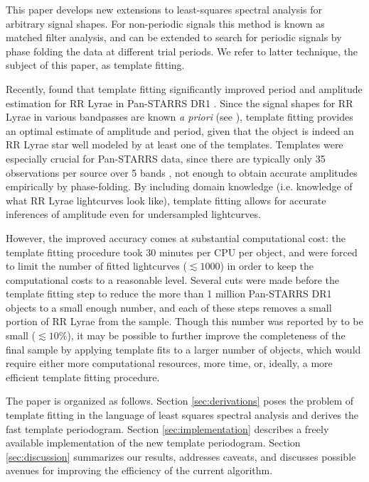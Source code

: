 \documentclass[iop]{emulateapj}
\begin{document}
This paper develops new extensions to least-squares spectral analysis for arbitrary
signal shapes. For non-periodic signals this method is known as matched filter analysis,
and can be extended to search for periodic signals by phase folding the data
at different trial periods. We refer to latter technique, the subject of this paper, as
template fitting. 

Recently, \cite{Sesar_etal_2016} found that template fitting significantly improved
period and amplitude estimation for RR Lyrae in Pan-STARRS DR1 \citep{PanSTARRS}. Since the signal
shapes for RR Lyrae in various bandpasses are known \emph{a priori} (see \cite{Sesar_etal_2010}), 
template fitting provides an optimal estimate of amplitude and period,
given that the object is indeed an RR Lyrae star well modeled by at least one of the templates. 
Templates were especially crucial for Pan-STARRS data, since there are typically only 
35 observations per source over 5 bands \citep{Hernitschek_etal_2016}, not enough to obtain 
accurate amplitudes empirically by phase-folding. By including domain knowledge (i.e. knowledge of what RR Lyrae 
lightcurves look like), template fitting allows for accurate inferences of amplitude even 
for undersampled lightcurves.

However, the improved accuracy comes at substantial computational cost: the template fitting 
procedure took 30 minutes per CPU per object, and \cite{Sesar_etal_2016} were forced to limit
the number of fitted lightcurves ($\lesssim 1000$) in order to keep the computational costs
to a reasonable level. Several cuts were made before the template fitting step to reduce the
more than 1 million Pan-STARRS DR1 objects to a small enough number, and each of these steps
removes a small portion of RR Lyrae from the sample. Though this number was reported by
\cite{Sesar_etal_2016} to be small ($\lesssim 10\%$), it may be possible to further improve
the completeness of the final sample by applying template fits to a larger number of objects,
which would require either more computational resources, more time, or, ideally, a more efficient
template fitting procedure.

The paper is organized as follows. Section \ref{sec:derivations} poses the problem of template
fitting in the language of least squares spectral analysis and derives the fast template
periodogram. Section \ref{sec:implementation} describes a freely available implementation 
of the new template periodogram. Section \ref{sec:discussion} summarizes our results, 
addresses caveats, and discusses possible avenues for improving the efficiency of the current 
algorithm.
\end{document}
